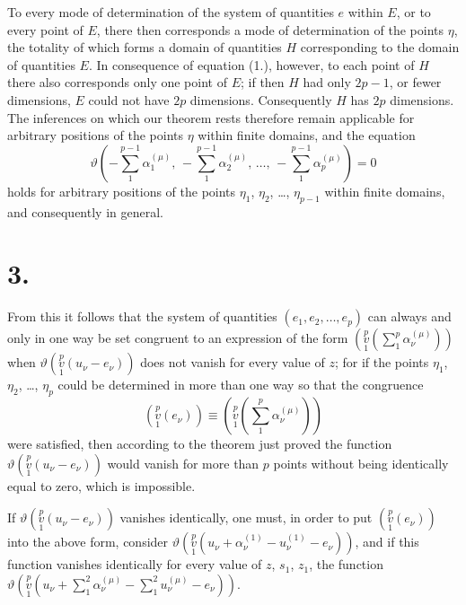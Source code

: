 \documentclass{article}
\begin{document}
To every mode of determination of the system of quantities $e$ within $E$, or to every point of $E$, there then corresponds a mode of determination of the points $\eta$, the totality of which forms a domain of quantities $H$ corresponding to the domain of quantities $E$. In consequence of equation (1.), however, to each point of $H$ there also corresponds only one point of $E$; if then $H$ had only $2p-1$, or fewer dimensions, $E$ could not have $2p$ dimensions. Consequently $H$ has $2p$ dimensions. The inferences on which our theorem rests therefore remain applicable for arbitrary positions of the points $\eta$ within finite domains, and the equation
\[
\vartheta\left(-\sum_1^{p-1} \alpha_1^{(\mu)},\, -\sum_1^{p-1} \alpha_2^{(\mu)},\, \dots,\, -\sum_1^{p-1} \alpha_p^{(\mu)}\right) = 0
\]
holds for arbitrary positions of the points $\eta_1$, $\eta_2$, \dots, $\eta_{p-1}$ within finite domains, and consequently in general.

\section*{3.}

From this it follows that the system of quantities $(e_1, e_2, \dots, e_p)$ can always and only in one way be set congruent to an expression of the form $\left(\overset{p}{\underset{1}{v}}\left(\displaystyle\sum_1^p \alpha_\nu^{(\mu)}\right)\right)$ when $\vartheta\left(\overset{p}{\underset{1}{v}}(u_\nu - e_\nu)\right)$ does not vanish for every value of $z$; for if the points $\eta_1$, $\eta_2$, \dots, $\eta_p$ could be determined in more than one way so that the congruence
\[
\left(\overset{p}{\underset{1}{v}}(e_\nu)\right) \equiv \left(\overset{p}{\underset{1}{v}}\left(\sum_1^p \alpha_\nu^{(\mu)}\right)\right)
\]
were satisfied, then according to the theorem just proved the function $\vartheta\left(\overset{p}{\underset{1}{v}}(u_\nu - e_\nu)\right)$ would vanish for more than $p$ points without being identically equal to zero, which is impossible.

If $\vartheta\left(\overset{p}{\underset{1}{v}}(u_\nu - e_\nu)\right)$ vanishes identically, one must, in order to put $\left(\overset{p}{\underset{1}{v}}(e_\nu)\right)$ into the above form, consider $\vartheta\left(\overset{p}{\underset{1}{v}}(u_\nu + \alpha_\nu^{(1)} - u_\nu^{(1)} - e_\nu)\right)$, and if this function vanishes identically for every value of $z$, $s_1$, $z_1$, the function $\vartheta\left(\overset{p}{\underset{1}{v}}\left(u_\nu + \displaystyle\sum_1^2 \alpha_\nu^{(\mu)} - \displaystyle\sum_1^2 u_\nu^{(\mu)} - e_\nu\right)\right)$.
\end{document}
